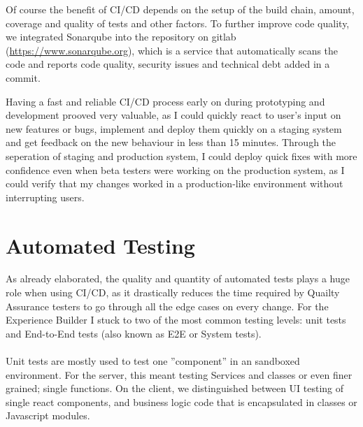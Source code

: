 Of course the benefit of CI/CD depends on the setup of the build chain, amount, coverage and quality of tests and other factors. To further improve code quality, we integrated Sonarqube into the repository on gitlab (\url{https://www.sonarqube.org}),
which is a service that automatically scans the code and reports code quality, security issues and technical debt added in a commit.

Having a fast and reliable CI/CD process early on during prototyping and development prooved very valuable, as I could quickly react to user's input on new features or bugs, implement and deploy them quickly on a staging system and get feedback
on the new behaviour in less than 15 minutes. Through the seperation of staging and production system, I could deploy quick fixes with more confidence even when beta testers were working on the production system, as I could verify that my changes
worked in a production-like environment without interrupting users.

\section{Automated Testing}
\label{sec:automated-testing}

As already elaborated, the quality and quantity of automated tests plays a huge role when using CI/CD, as it drastically reduces the time required by Quailty Assurance testers to go through all the edge cases on every change.
For the Experience Builder I stuck to two of the most common testing levels: unit tests and End-to-End tests (also known as E2E or System tests).
\\\\
Unit tests are mostly used to test one ''component'' in an sandboxed environment. For the server, this meant testing Services and classes or even finer grained; single functions.
On the client, we distinguished between UI testing of single react components, and business logic code that is encapsulated in classes or Javascript modules.

